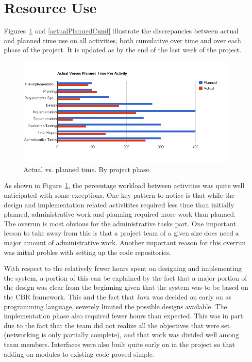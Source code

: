 \section{Resource Use}\label{resourceUse}

Figures~\ref{perActivity} and \ref{actualPlannedCuml} illustrate
the discrepancies between actual and planned time use on all
activities, both cumulative over time and over each phase of the
project. It is updated as by the end of the last week of the project.

\begin{centering}
  \begin{figure}
    \includegraphics[width = \textwidth]{Evaluation/time_per_activity.png}
    \caption{Actual vs. planned time. By project phase.}
    \label{perActivity}
  \end{figure}
\end{centering}

As shown in Figure~\ref{perActivity}, the percentage workload between activities was quite well anticipated with some exceptions. One key pattern to notice is that while the design and implementation related activitites required less time than initially planned, administrative work and planning required more work than planned. The overrun is most obvious for the administrative tasks part. One important lesson to take away from this is that a project team of a given size does need a major amount of administrative work. Another important reason for this overrun was initial probles with setting up the code repositories.

With respect to the relatively fewer hours spent on designing and implementing the system, a portion of this can be explained by the fact that a major portion of the design was clear from the beginning given that the system was to be based on the CBR framework. This and the fact that Java was decided on early on as programming language, severely limited the possible designs available. The implementation phase also required fewer hours than expected. This was in part due to the fact that the team did not realize all the objectives that were set (networking is only partially complete), and that work was divided well among team members. Interfaces were also built quite early on in the project so that adding on modules to existing code proved simple.



